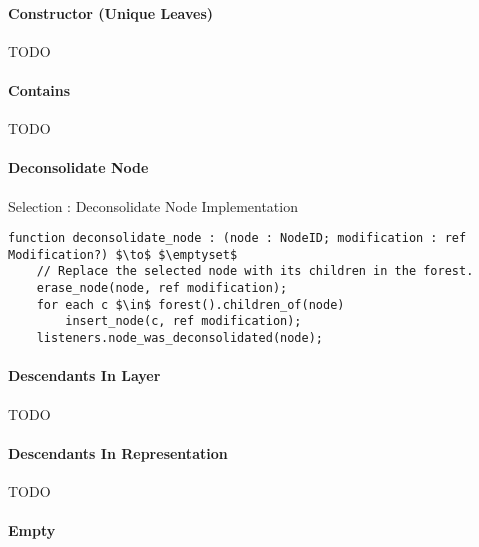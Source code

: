\paragraph{Constructor (Unique Leaves)}

TODO

\paragraph{Contains}

TODO

\paragraph{Deconsolidate Node}

\begin{stulisting}[H]
\caption{Selection : Deconsolidate Node Implementation}
\begin{lstlisting}[style=Default]
function deconsolidate_node : (node : NodeID; modification : ref Modification?) $\to$ $\emptyset$
	// Replace the selected node with its children in the forest.
	erase_node(node, ref modification);
	for each c $\in$ forest().children_of(node)
		insert_node(c, ref modification);
	listeners.node_was_deconsolidated(node);
\end{lstlisting}
\end{stulisting}

\paragraph{Descendants In Layer}

TODO

\paragraph{Descendants In Representation}

TODO

\paragraph{Empty}

